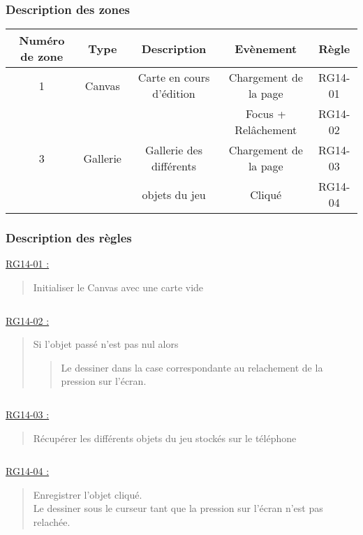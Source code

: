\documentclass{report}
\begin{document}
		\subsubsection{Description des zones}
		
			\begin{tabular}{|c|c|c|c|c|} \hline
				Numéro de zone & Type  & Description & Evènement &	Règle \\\hline
				1 & Canvas   & Carte en cours d'édition & Chargement de la page & RG14-01 \\
				  &          &                          & Focus + Relâchement & RG14-02 \\\hline
				3 & Gallerie & Gallerie des différents  & Chargement de la page & RG14-03 \\
				  &          & objets du jeu            & Cliqué                & RG14-04 \\\hline
			\end{tabular}
			
		\subsubsection{Description des règles}

			\underline{RG14-01 :}
				\begin{quote}
				Initialiser le Canvas avec une carte vide
				\end{quote}
				
			$\,$
			
			\underline{RG14-02 :}
				\begin{quote}
				Si l'objet passé n'est pas nul alors
					\begin{quote}
					Le dessiner dans la case correspondante au relachement de la pression sur l'écran.
					\end{quote}
				\end{quote}
				
			$\,$
			
			\underline{RG14-03 :}
				\begin{quote}
				Récupérer les différents objets du jeu stockés sur le téléphone
				\end{quote}
				
			$\,$
			
			\underline{RG14-04 :}
				\begin{quote}
				Enregistrer l'objet cliqué.\\
				Le dessiner sous le curseur tant que la pression sur l'écran n'est pas relachée.
				\end{quote}
				
\end{document}
